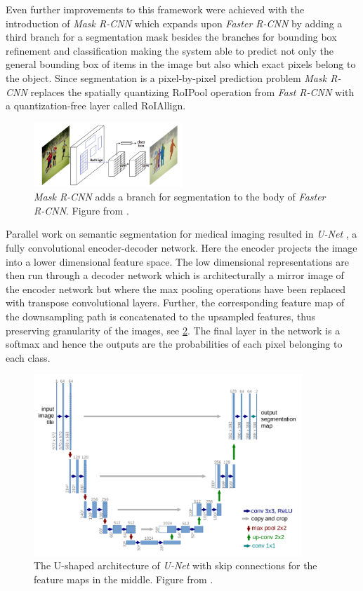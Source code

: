 \documentclass{kththesis}
\newcommand{\bibentry}[1]{\parencite{#1}}
\begin{document}
Even further improvements to this framework were achieved with the introduction of \emph{Mask R-CNN}
\bibentry{he2017mask} which expands upon \emph{Faster R-CNN} by adding a third
branch for a segmentation mask besides the branches for bounding box refinement
and classification making the system able to predict not only the general
bounding box of items in the image but also which exact pixels belong to the
object. Since segmentation is a pixel-by-pixel prediction problem \emph{Mask
  R-CNN} replaces the spatially quantizing RoIPool operation from \emph{Fast
  R-CNN} with a quantization-free layer called RoIAllign. 

\begin{figure}[h]
  \centering
  \includegraphics[width=0.5\textwidth]{MaskR-CNN}
  \caption{\textit{Mask R-CNN} adds a branch for segmentation to the body of
    \textit{Faster R-CNN}. Figure from \textcite[]{he2017mask}.}
  \label{fig:AlexNet}
  \end{figure}

Parallel work on semantic segmentation for medical imaging \mbox{resulted} in
\emph{U-Net} \parencite[]{UNet}, a fully convolutional encoder-decoder network.
Here the encoder projects the image into a lower dimensional feature space.
The low dimensional representations are then run through a decoder
network which is architecturally a mirror image of the encoder network but where
the max pooling operations have been replaced with transpose convolutional
layers. Further, the corresponding feature map of the downsampling path is
concatenated to the upsampled features, thus preserving
granularity of the images, see \cref{fig:UNet}. The final layer in the network is a softmax and hence
the outputs are the probabilities of each pixel belonging to each class.
\begin{figure}[h]
  \centering
  \includegraphics[width=0.9\textwidth]{U-Net}
  \caption{The U-shaped architecture of \textit{U-Net} with skip connections for
    the feature maps in the middle. Figure from \textcite[]{UNet}.}
  \label{fig:UNet}
  \end{figure}
\end{document}
